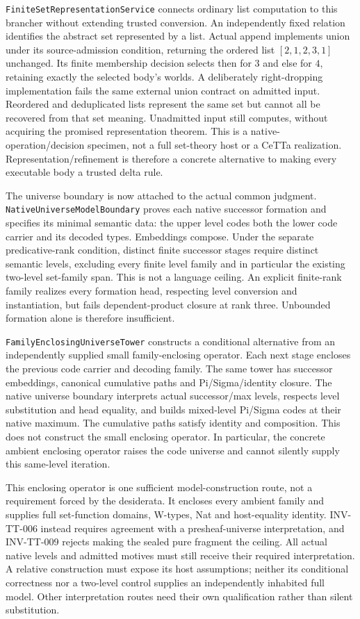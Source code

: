 \documentclass[11pt]{article}
\theoremstyle{definition}
\theoremstyle{remark}
\begin{document}
\nolinkurl{FiniteSetRepresentationService} connects ordinary list computation
to this brancher without extending trusted conversion. An independently
fixed relation identifies the abstract set represented by a list. Actual
append implements union under its source-admission condition, returning the
ordered list $[2,1,2,3,1]$ unchanged. Its finite membership decision selects
then for $3$ and else for $4$, retaining exactly the selected body's worlds.
A deliberately right-dropping implementation fails the same external union
contract on admitted input. Reordered and deduplicated lists represent the
same set but cannot all be recovered from that set meaning. Unadmitted input
still computes, without acquiring the promised representation theorem.
This is a native-operation/decision specimen, not a full set-theory host or
a CeTTa realization. Representation/refinement is therefore a concrete
alternative to making every executable body a trusted delta rule.

The universe boundary is now attached to the actual common judgment.
\nolinkurl{NativeUniverseModelBoundary} proves each native successor formation
and specifies its minimal semantic data: the upper level codes both the
lower code carrier and its decoded types. Embeddings compose. Under the
separate predicative-rank condition, distinct finite successor stages require
distinct semantic levels, excluding every finite level family and in
particular the existing two-level set-family span. This is not a language
ceiling. An explicit finite-rank family realizes every formation head,
respecting level conversion and instantiation, but fails dependent-product
closure at rank three. Unbounded formation alone is therefore insufficient.

\nolinkurl{FamilyEnclosingUniverseTower} constructs a conditional alternative
from an independently supplied small family-enclosing operator. Each next
stage encloses the previous code carrier and decoding family. The same tower
has successor embeddings, canonical cumulative paths and Pi/Sigma/identity
closure. The native universe boundary interprets actual successor/max levels,
respects level substitution and head equality, and builds mixed-level
Pi/Sigma codes at their native maximum. The cumulative paths satisfy identity
and composition. This does not construct the small enclosing operator.
In particular, the concrete ambient enclosing
operator raises the code universe and cannot silently supply this same-level
iteration.

This enclosing operator is one sufficient model-construction route, not
a requirement forced by the desiderata. It encloses every ambient family
and supplies full set-function domains, W-types, Nat and host-equality
identity. INV-TT-006 instead requires agreement with a presheaf-universe
interpretation, and INV-TT-009 rejects making the sealed pure fragment the
ceiling. All actual native levels and admitted motives must still receive
their required interpretation. A relative construction must expose its
host assumptions; neither its conditional correctness nor a two-level
control supplies an independently inhabited full model. Other interpretation
routes need their own qualification rather than silent substitution.
\end{document}
